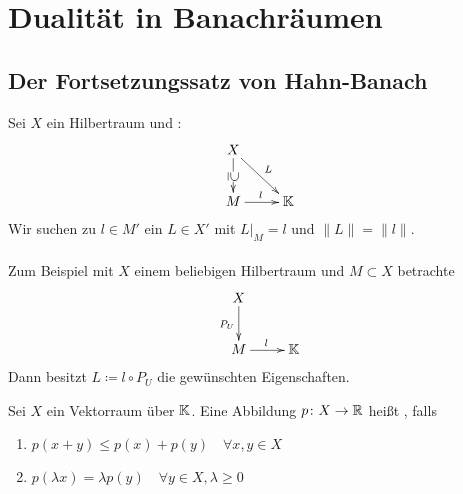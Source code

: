 

\chapter*{Dualität in Banachräumen}  \setcounter{section}{19}



\section{Der Fortsetzungssatz von Hahn-Banach}



\begin{motivation}
	Sei $X$ ein Hilbertraum und {}: {}
	\[ \begin{xy} \xymatrix{  
			X \ar[rd]^L \ar[d]|{ \rotatebox[origin=c]{270}{$\supseteq$}  }          \\
      		M \ar[r]^l    				  &   \MdK			
		} \end{xy} \] %
	Wir suchen zu $l \in M'$ ein $L \in X'$ mit $L|_{M} = l$ und $\| L \| = \| l \|$. \\ \\
 	Zum Beispiel mit $X$ einem beliebigen Hilbertraum und $M \subset X$ betrachte
 		\[ \begin{xy} \xymatrix{
			X \ar[d]_{ P_{U} }                      \\
      		M \ar[r]^l    				   &   \MdK			
		} \end{xy} \]
		Dann besitzt $L \coloneqq l \circ P_{U}$ die gewünschten Eigenschaften.
\end{motivation}
 
 
\begin{definition}
	Sei $X$ ein Vektorraum über $\mathbb{K}$. Eine Abbildung $p \colon X \rightarrow \mathbb{R}$ hei{\ss}t , falls
 	\begin{enumerate}[label=\alph*\upshape)]
 		\item $p( x + y) \leq p(x) + p(y) \quad \forall x, y \in X$
 		\item $p(\lambda x ) = \lambda p(y) \quad \forall y \in X, \lambda \geq 0$
 	\end{enumerate}
\end{definition}


